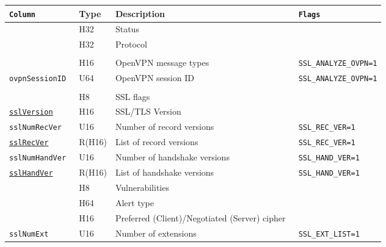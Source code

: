 \documentclass[documentation]{subfiles}
\begin{document}
\begin{longtable}{>{\tt}lll>{\tt\small}l}
    \toprule
    {\bf Column} & {\bf Type} & {\bf Description} & {\bf Flags}\\
    \midrule\endhead%
    \nameref{sslStat}                            & H32           & Status                                         & \\
    \nameref{sslProto}                           & H32           & Protocol                                       & \\
    \\
    \nameref{ovpnType}                           & H16           & OpenVPN message types                          & SSL\_ANALYZE\_OVPN=1\\
    ovpnSessionID                                & U64           & OpenVPN session ID                             & SSL\_ANALYZE\_OVPN=1\\
    \\
    \nameref{sslFlags}                           & H8            & SSL flags                                      & \\
    \hyperref[sslVersion]{sslVersion}            & H16           & SSL/TLS Version                                & \\
    sslNumRecVer                                 & U16           & Number of record versions                      & SSL\_REC\_VER=1\\
    \hyperref[sslVersion]{sslRecVer}             & R(H16)        & List of record versions                        & SSL\_REC\_VER=1\\
    sslNumHandVer                                & U16           & Number of handshake versions                   & SSL\_HAND\_VER=1\\
    \hyperref[sslVersion]{sslHandVer}            & R(H16)        & List of handshake versions                     & SSL\_HAND\_VER=1\\
    \nameref{sslVuln}                            & H8            & Vulnerabilities                                & \\
    \nameref{sslAlert}                           & H64           & Alert type                                     & \\
    \nameref{sslCipher}                          & H16           & Preferred (Client)/Negotiated (Server) cipher  & \\
    sslNumExt                                    & U16           & Number of extensions                           & SSL\_EXT\_LIST=1\\

\end{longtable}
\end{document}
